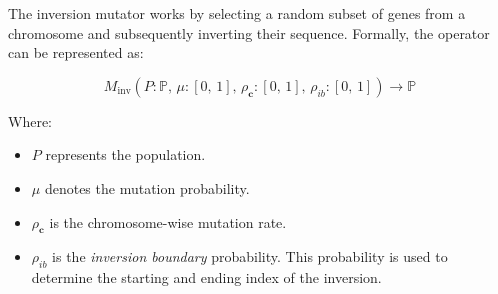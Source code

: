 
  \begin{definition}
  \label{def:keen:op:mut:inversion}
    The inversion mutator works by selecting a random subset of genes from a chromosome and subsequently inverting 
    their sequence. Formally, the operator can be represented as:

    \begin{equation}
      M_\mathrm{inv}(P: \mathbb{P},\, \mu: [0,\, 1],\, \rho_\mathbf{c}: [0,\, 1],\, \rho_{ib}: [0,\, 1]) \to \mathbb{P}
    \end{equation}

    Where:
    \begin{itemize}
        \item \(P\) represents the population.
        \item \(\mu\) denotes the mutation probability.
        \item \(\rho_\mathbf{c}\) is the chromosome-wise mutation rate.
        \item \(\rho_{ib}\) is the \textit{inversion boundary} probability. 
          This probability is used to determine the starting and ending index 
          of the inversion.
    \end{itemize}
  \end{definition}
